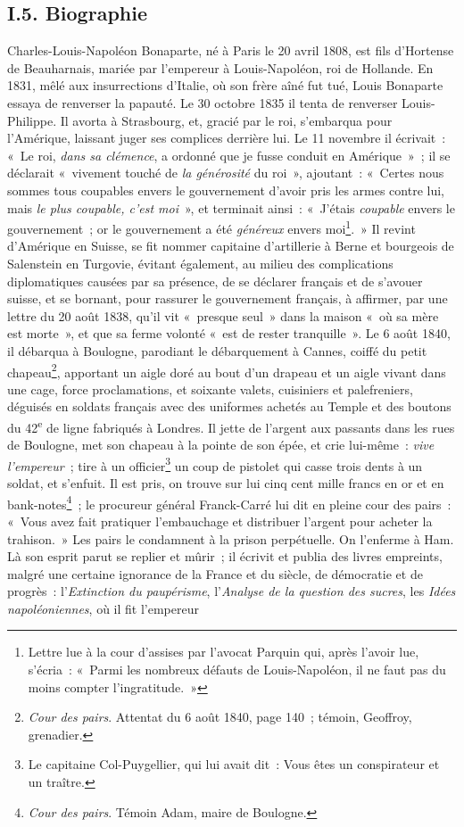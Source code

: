 \documentclass[french,twoside]{book} %
\begin{document}
\subsection[{I.5. Biographie}]{I.5. Biographie}
\noindent Charles-Louis-Napoléon Bonaparte, né à Paris le 20 avril 1808, est fils d’Hortense de Beauharnais, mariée par l’empereur à Louis-Napoléon, roi de Hollande. En 1831, mêlé aux insurrections d’Italie, où son frère aîné fut tué, Louis Bonaparte essaya de renverser la papauté. Le 30 octobre 1835 il tenta de renverser Louis-Philippe. Il avorta à Strasbourg, et, gracié par le roi, s’embarqua pour l’Amérique, laissant juger ses complices derrière lui. Le 11 novembre il écrivait : « Le roi, \emph{dans sa clémence}, a ordonné que je fusse conduit en Amérique » ; il se déclarait « vivement touché de \emph{la générosité} du roi », ajoutant : « Certes nous sommes tous coupables envers le gouvernement d’avoir pris les armes contre lui, mais \emph{le plus coupable, c’est moi} », et terminait ainsi : « J’étais \emph{coupable} envers le gouvernement ; or le gouvernement a été \emph{généreux} envers moi\footnote{Lettre lue à la cour d’assises par l’avocat Parquin qui, après l’avoir lue, s’écria : « Parmi les nombreux défauts de Louis-Napoléon, il ne faut pas du moins compter l’ingratitude. »}. » Il revint d’Amérique en Suisse, se fit nommer capitaine d’artillerie à Berne et bourgeois de Salenstein en Turgovie, évitant également, au milieu des complications diplomatiques causées par sa présence, de se déclarer français et de s’avouer suisse, et se bornant, pour rassurer le gouvernement français, à affirmer, par une lettre du 20 août 1838, qu’il vit « presque seul » dans la maison « où sa mère est morte », et que sa ferme volonté « est de rester tranquille ». Le 6 août 1840, il débarqua à Boulogne, parodiant le débarquement à Cannes, coiffé du petit chapeau\footnote{\emph{Cour des pairs}. Attentat du 6 août 1840, page 140 ; témoin, Geoffroy, grenadier.}, apportant un aigle doré au bout d’un drapeau et un aigle vivant dans une cage, force proclamations, et soixante valets, cuisiniers et palefreniers, déguisés en soldats français avec des uniformes achetés au Temple et des boutons du 42\textsuperscript{e} de ligne fabriqués à Londres. Il jette de l’argent aux passants dans les rues de Boulogne, met son chapeau à la pointe de son épée, et crie lui-même : \emph{vive l’empereur} ; tire à un officier\footnote{Le capitaine Col-Puygellier, qui lui avait dit : Vous êtes un conspirateur et un traître.} un coup de pistolet qui casse trois dents à un soldat, et s’enfuit. Il est pris, on trouve sur lui cinq cent mille francs en or et en bank-notes\footnote{\emph{Cour des pairs}. Témoin Adam, maire de Boulogne.} ; le procureur général Franck-Carré lui dit en pleine cour des pairs : « Vous avez fait pratiquer l’embauchage et distribuer l’argent pour acheter la trahison. » Les pairs le condamnent à la prison perpétuelle. On l’enferme à Ham. Là son esprit parut se replier et mûrir ; il écrivit et publia des livres empreints, malgré une certaine ignorance de la France et du siècle, de démocratie et de progrès : l’\emph{Extinction du paupérisme}, l’\emph{Analyse de la question des sucres}, les \emph{Idées napoléoniennes}, où il fit l’empereur 
\end{document}
